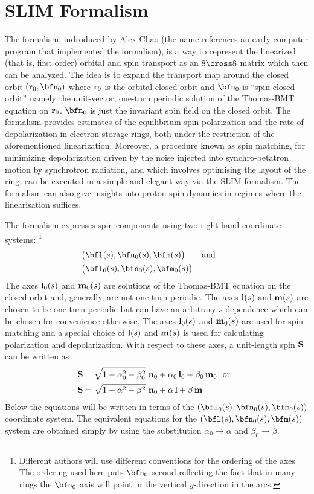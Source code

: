 {\section{SLIM Formalism}
\label{s:slim}

The  formalism\cite{b:chao.spin,b:barber99}, indroduced by Alex Chao (the name references
an early computer program that implemented the formalism), is a way to represent the linearized
(that is, first order) orbital and spin transport as an $8 \cross 8$ matrix which then can be
analyzed. The idea is to expand the transport map around the closed orbit $(\bfr_0, \bfn_0)$ where
${\bf r}_0$ is the orbital closed orbit and $\bfn_0$ is ``spin closed orbit'' namely the unit-vector,
one-turn periodic solution of the Thomas-BMT equation on ${\bf r}_0$. $\bfn_0$ is just the invariant
spin field on the closed orbit. The formalism provides estimates of the equilibrium spin
polarization and the rate of depolarization in electron storage rings, both under the restriction of
the aforementioned linearization. Moreover, a procedure known as spin matching, for minimizing
depolarization driven by the noise injected into synchro-betatron motion by synchrotron radiation,
and which involves optimising the layout of the ring, can be executed in a simple and elegant way
via the SLIM formalism. The formalism can also give insights into proton spin dynamics in regimes
where the linearisation suffices.

The  formalism expresses spin components using two right-hand coordinate systems:
\footnote{Different authors will use different conventions for the ordering of the axes
The ordering used here puts $\bfn_0$ second reflecting the fact that in many rings the $\bfn_0$
axis will point in the vertical $y$-direction in the arcs.}
\begin{align}
  &\big( \bfl(s), \bfn_0(s), \bfm(s) \big) 
  \qquad \text{and} \qquad \CRNO
  &\big( \bfl_0(s), \bfn_0(s), \bfm_0(s) \big)
\end{align}
The axes ${\bf l}_0(s)$ and ${\bf m}_0(s)$ are solutions of the Thomas-BMT equation on the closed
orbit and, generally, are not one-turn periodic. The axes ${\bf l}(s)$ and ${\bf m}(s)$ are chosen
to be one-turn periodic but can have an arbitrary $s$ dependence which can be chosen for convenience
otherwise. The axes ${\bf l}_0(s)$ and ${\bf m}_0(s)$ are used for spin matching and a special
choice of ${\bf l}(s)$ and ${\bf m}(s)$ is used for calculating polarization and depolarization.
With respect to these axes, a unit-length spin $\bf {{\bf S}}$ can be written as
\begin{align}
  \bf{S} &= \sqrt{1- \alpha_0^2 - \beta_0^2} ~{\bf n}_0 + \alpha_0 \, {\bf l}_0 + \beta_0 \, {\bf m}_0 
  ~~{\rm or }~~ \nonumber \\
  \bf{S} &= \sqrt{1- \alpha^2 - \beta^2} ~{\bf n}_0 + \alpha \, {\bf l} + \beta \, {\bf m}
  \label{s1ab}
\end{align}
Below the equations will be written in terms of the $(\bfl_0(s), \bfn_0(s), \bfm_0(s))$ coordinate system.
The equivalent equations for the $(\bfl(s), \bfn_0(s), \bfm(s))$ system are obtained simply by using the
substitution $\alpha_0 \rightarrow \alpha$ and $\beta_0 \rightarrow \beta$.

}
